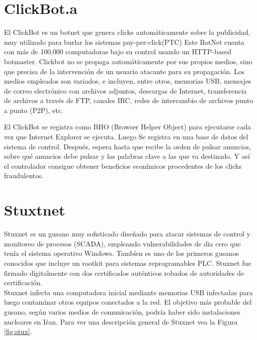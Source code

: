 \documentclass[a4paper,12pt]{article}
\begin{document}
\section{ClickBot.a}

El ClickBot es un botnet que genera clicks automáticamente sobre la publicidad,
muy utilizado para burlar los sistemas pay-per-click(PTC) \cite{clickF}
Este BotNet cuenta con más de 100,000 computadoras bajo su control usando un HTTP-based botmaster.
Clickbot no se propaga automáticamente por sus propios medios, sino que precisa de la intervención de un usuario atacante para su propagación.
Los medios empleados son variados, e incluyen, entre otros, memorias USB, mensajes de correo electrónico con archivos
adjuntos, descargas de Internet, transferencia de archivos a través de FTP, canales IRC, redes de intercambio de archivos punto a punto (P2P), etc. \par
El ClickBot se registra como BHO (Browser Helper Object) para ejecutarse cada vez que Internet Explorer se ejecuta. Luego
Se registra en una base de datos del sistema de control. Después, espera hasta que recibe la orden de pulsar anuncios,
sobre qué anuncios debe pulsar y las palabras clave a las que va destinado. Y así el controlador consigue obtener beneficios econímicos
procedentes de los clicks fraudulentos.

\section{Stuxtnet}

Stuxnet es un gusano muy sofisticado diseñado para atacar sistemas de control y monitoreo de procesos (SCADA), empleando
vulnerabilidades de dia cero que tenía el sistema operativo Windows. Tambíen es uno de los primeros gusanos conocidos
que incluye un rootkit para sistemas reprogramables PLC. Stuxnet fue firmado digitalmente con dos certificados auténticos robados de autoridades de certificación. \cite{stux}\\
Stuxnet infecta una computadora inicial mediante memorias USB infectadas para luego contaminar otros equipos conectados a la red.
El objetivo más probable del gusano, según varios medios de comunicación, podría haber sido instalaciones nucleares en Iŕan.
Para ver una descripción general de Stuxnet vea la Figura \ref{fig:stux}. \par
\end{document}
